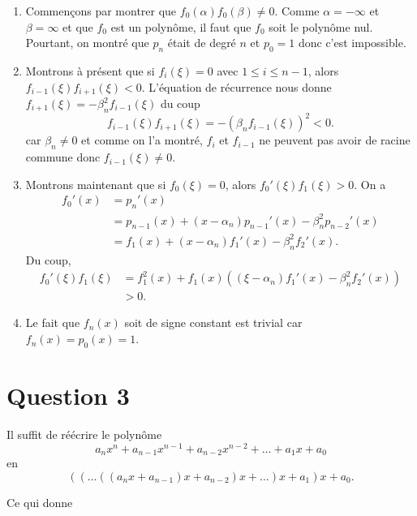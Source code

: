 \documentclass{article}
\begin{document}
\begin{enumerate}
  \item Commençons par montrer que $f_0(\alpha)f_0(\beta) \neq 0$.
    Comme $\alpha = -\infty$ et $\beta = \infty$ et que $f_0$ est un polynôme,
    il faut que $f_0$ soit le polynôme nul.
    Pourtant, on montré que $p_n$ était de degré $n$ et $p_0 = 1$ donc
    c'est impossible.
  \item Montrons à présent que si $f_i(\xi) = 0$ avec $1 \leq i \leq n-1$,
    alors $f_{i-1}(\xi)f_{i+1}(\xi) < 0$.
    L'équation de récurrence nous donne
    $f_{i+1}(\xi) = -\beta_n^2f_{i-1}(\xi)$ du coup
    \[ f_{i-1}(\xi)f_{i+1}(\xi) = -(\beta_nf_{i-1}(\xi))^2 < 0. \]
    car $\beta_n \neq 0$ et comme on l'a montré, $f_i$ et $f_{i-1}$ ne peuvent
    pas avoir de racine commune donc $f_{i-1}(\xi) \neq 0$.
  \item Montrons maintenant que si $f_0(\xi) = 0$,
    alors $f_0'(\xi)f_1(\xi) > 0$.
    On a
    \begin{align*}
      f_0'(x) & = p_n'(x)\\
              & = p_{n-1}(x) + (x-\alpha_n)p_{n-1}'(x) - \beta_n^2p_{n-2}'(x)\\
              & = f_1(x) + (x-\alpha_n) f_1'(x) - \beta_n^2 f_2'(x).
    \end{align*}
    Du coup,
    \begin{align*}
      f_0'(\xi)f_1(\xi) & = f_1^2(x) + f_1(x)
      ((\xi-\alpha_n) f_1'(x) - \beta_n^2 f_2'(x))\\
      & > 0.
    \end{align*}
  \item Le fait que $f_n(x)$ soit de signe constant est trivial car
    $f_n(x) = p_0(x) = 1$.
\end{enumerate}

\section*{Question 3}
Il suffit de réécrire le polynôme
\[ a_nx^n + a_{n-1}x^{n-1} + a_{n-2}x^{n-2} + \ldots + a_1x + a_0 \]
en
\[ ((\ldots((a_nx + a_{n-1})x + a_{n-2})x + \ldots)x + a_1)x + a_0. \]

Ce qui donne

\end{document}
